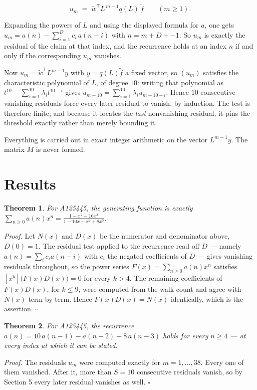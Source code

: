 \documentclass[11pt]{article}
\newtheorem{theorem}{Theorem}
\theoremstyle{definition}
\begin{document}
\[u_m \;=\; \tilde w^{\mathsf T} L^{\,m-1} q(L)\,\tilde f \qquad (m \ge 1).\]

Expanding the powers of $L$ and using the displayed formula for $a$, one gets $u_m = a(n) - \sum_{i=1}^{D} c_i\,a(n-i)$ with $n = m + D + -1$. So $u_m$ is exactly the residual of the claim at that index, and the recurrence holds at an index $n$ if and only if the corresponding $u_m$ vanishes.

Now $u_m = \tilde w^{\mathsf T} L^{m-1} y$ with $y = q(L)\tilde f$ a fixed vector, so $(u_m)$ satisfies the characteristic polynomial of $L$, of degree $10$: writing that polynomial as $t^{10} - \sum_{i=1}^{10} \lambda_i t^{10-i}$ gives $u_{m+10} = \sum_{i=1}^{10} \lambda_i u_{m+10-i}$. Hence $10$ consecutive vanishing residuals force every later residual to vanish, by induction. The test is therefore finite; and because it locates the {\itshape last} nonvanishing residual, it pins the threshold exactly rather than merely bounding it.

Everything is carried out in exact integer arithmetic on the vector $L^{m-1}y$. The matrix $M$ is never formed.

\section{Results}

\begin{theorem} For A125445, the generating function is exactly $\sum_{n\ge 0} a(n)x^n = \frac{1 - x^{2} - 16x^{3}}{1 - 10x + x^{2} + 8x^{3}}$.\end{theorem}

{\itshape Proof.} Let $N(x)$ and $D(x)$ be the numerator and denominator above, $D(0)=1$. The residual test applied to the recurrence read off $D$ --- namely $a(n) = \sum_i c_i a(n-i)$ with $c_i$ the negated coefficients of $D$ --- gives vanishing residuals throughout, so the power series $F(x)=\sum_{n\ge 0}a(n)x^n$ satisfies $[x^k]\bigl(F(x)D(x)\bigr) = 0$ for every $k > 4$. The remaining coefficients of $F(x)D(x)$, for $k \le 9$, were computed from the walk count and agree with $N(x)$ term by term. Hence $F(x)D(x) = N(x)$ identically, which is the assertion. $\square$

\begin{theorem} For A125445, the recurrence $a(n) = 10\,a(n-1) - a(n-2) - 8\,a(n-3)$ holds for every $n \ge 4$ --- at every index at which it can be stated.\end{theorem}

{\itshape Proof.} The residuals $u_m$ were computed exactly for $m = 1,\dots,38$. Every one of them vanished. After it, more than $S = 10$ consecutive residuals vanish, so by Section 5 every later residual vanishes as well. $\square$
\end{document}

